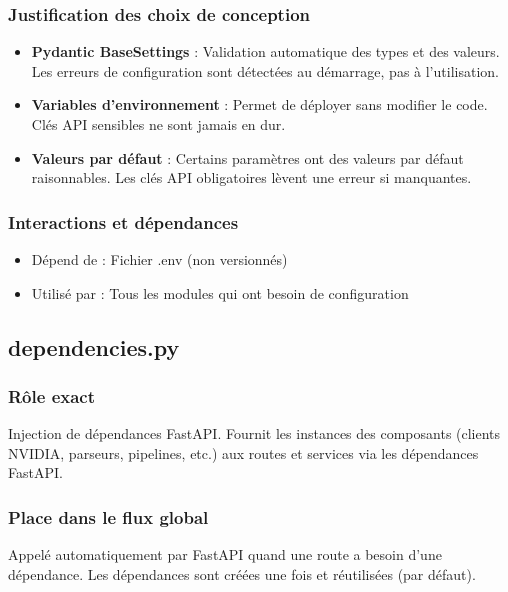 \documentclass[12pt,a4paper,oneside]{book}
\begin{document}
\subsubsection{Justification des choix de conception}

\begin{itemize}
    \item \textbf{Pydantic BaseSettings} : Validation automatique des types et des valeurs. Les erreurs de configuration sont détectées au démarrage, pas à l'utilisation.
    
    \item \textbf{Variables d'environnement} : Permet de déployer sans modifier le code. Clés API sensibles ne sont jamais en dur.
    
    \item \textbf{Valeurs par défaut} : Certains paramètres ont des valeurs par défaut raisonnables. Les clés API obligatoires lèvent une erreur si manquantes.
\end{itemize}

\subsubsection{Interactions et dépendances}

\begin{itemize}
    \item Dépend de : Fichier .env (non versionnés)
    \item Utilisé par : Tous les modules qui ont besoin de configuration
\end{itemize}

\subsection{dependencies.py}

\subsubsection{Rôle exact}

Injection de dépendances FastAPI. Fournit les instances des composants (clients NVIDIA, parseurs, pipelines, etc.) aux routes et services via les dépendances FastAPI.

\subsubsection{Place dans le flux global}

Appelé automatiquement par FastAPI quand une route a besoin d'une dépendance. Les dépendances sont créées une fois et réutilisées (par défaut).
\end{document}
